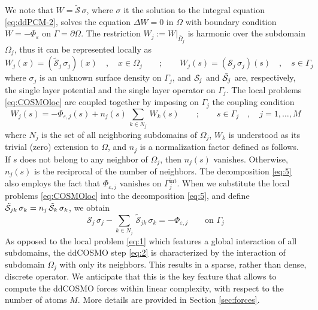 We note that $W = \tilde{\mathcal{S}}\,\sigma$, where $\sigma$ it the solution to the integral equation \eqref{eq:ddPCM-2}, solves the equation $\Delta W = 0$ in $\Omega$ with boundary condition $W=-\Phi_\varepsilon$ on $\Gamma=\partial \Omega$. 
The restriction $W_j := W |_{\overline{\Omega}_j}$ is harmonic over the subdomain $\Omega_j$, thus it can be represented locally as 
\begin{equation}\label{eq:COSMOloc}
W_j(x) = (\tilde{\mathcal{S}}_j \,  \sigma_j) (x) \quad , \quad x \in \Omega_j \qquad ; \qquad
W_j(s) = (\mathcal{S}_j \,  \sigma_j) (s) \quad , \quad s \in \Gamma_j
\end{equation}
where $\sigma_j$ is an unknown surface density on $\Gamma_j$, and $\mathcal{S}_j$ and $\tilde{\mathcal{S}}_j$ are, respectively, the single layer potential and the single layer operator on $\Gamma_j$. The local problems \eqref{eq:COSMOloc} are coupled together by imposing on $\Gamma_j$ the coupling condition
\begin{equation}\label{eq:5}
W_j(s) = - \Phi_{\varepsilon,j}(s) +  n_j(s) \, \sum_{k \in N_j} \,{W}_k(s) \qquad ; \qquad s \in \Gamma_j \quad , \quad j = 1, \ldots , M
\end{equation}
where $N_j$ is the set of all neighboring subdomains of $\Omega_j$, $W_k$ is understood as its trivial (zero) extension to $\Omega$, and $n_j$ is a normalization factor defined as follows. If $s$ does not belong to any neighbor of $\Omega_j$, then $n_j(s)$ vanishes. Otherwise, $n_j(s)$ is the reciprocal of the number of neighbors. The decomposition \eqref{eq:5} also employs the fact that $\Phi_{\varepsilon,j}$ vanishes on $\Gamma_j^\text{int}$. When we substitute the local problems \eqref{eq:COSMOloc} into the decomposition \eqref{eq:5}, and define $\tilde{\mathcal{S}}_{jk} \, \sigma_k = n_j \, \tilde{\mathcal{S}}_k \, \sigma_k$, we obtain
\begin{equation}\label{eq:2}
\mathcal{S}_j \, \sigma_j  -  \sum_{k \in N_j} \, \tilde{\mathcal{S}}_{jk} \, \sigma_k = -  \Phi_{\varepsilon,j} \qquad \text{on } \Gamma_j
\end{equation}
As opposed to the local problem \eqref{eq:1} which features a global interaction of all subdomains, the ddCOSMO step \eqref{eq:2} is characterized by the interaction of subdomain $\Omega_j$ with only its neighbors. This results in a sparse, rather than dense, discrete operator. We anticipate that this is the key feature that allows to compute the ddCOSMO forces within linear complexity, with respect to the number of atoms $M$. More details are provided in Section \ref{sec:forces}.
\black 

